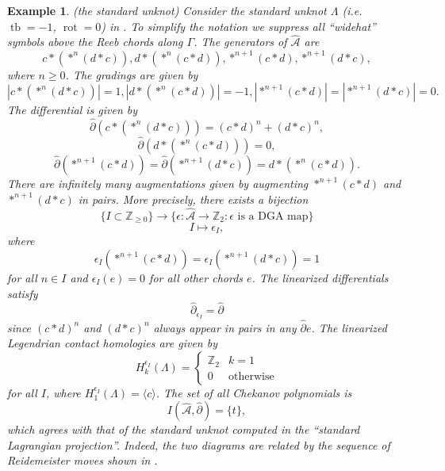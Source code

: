 \documentclass[11pt]{amsart}
\theoremstyle{mystyle}
\newtheorem{example}[example]{Example}
\newcommand{\Z}{\mathbb{Z}}
\newcommand{\<}{\langle}
\renewcommand{\>}{\rangle}
\DeclareMathOperator{\rot}{\text{rot}}
\DeclareMathOperator{\tb}{tb}
\begin{document}
\begin{example}(the standard unknot)
	Consider the standard unknot $\Lambda$ (i.e. $\tb = -1$, $\rot = 0$) in . To simplify the notation we suppress all ``widehat'' symbols above the Reeb chords along $\Gamma$. The generators of $\widehat{\mathcal{A}}$ are \[c *(*^n (d * c)), d *(*^n (c * d)), *^{n+1}(c*d), *^{n+1}(d*c),\] where $n \geq 0$. The gradings are given by \[|c *(*^n (d * c))| = 1, |d *(*^n (c * d))| = -1, |*^{n+1}(c*d)| = |*^{n+1}(d*c)| = 0.\] The differential is given by \[\widehat{\partial} (c *(*^n (d * c))) = (c*d)^n + (d*c)^n,\] \[\widehat{\partial} (d *(*^n (c * d))) = 0,\] \[\widehat{\partial}(*^{n+1}(c*d)) = \widehat{\partial}(*^{n+1}(d*c)) = d *(*^n (c * d)).\] There are infinitely many augmentations given by augmenting $*^{n+1}(c*d)$ and $*^{n+1}(d*c)$ in pairs. More precisely, there exists a bijection \[\{I \subset \mathbb{Z}_{\geq 0}\} \rightarrow \{\epsilon:\widehat{\mathcal{A}} \rightarrow \Z_2 : \epsilon \text{ is a DGA map}\}\] \[I \mapsto \epsilon_I,\] where \[\epsilon_I(*^{n+1}(c*d)) = \epsilon_I(*^{n+1}(d*c)) = 1\] for all $n \in I$ and $\epsilon_I(e) = 0$ for all other chords $e$. The linearized differentials satisfy \[\widehat{\partial}_{\epsilon_I} = \widehat{\partial}\] since $(c * d)^n$ and $(d * c)^n$ always appear in pairs in any $\widehat{\partial} e$. The linearized Legendrian contact homologies are given by \[H^{\epsilon_I}_k(\Lambda) = \begin{cases}
		\Z_2 & k = 1 \\
		0 & \text{otherwise}
	\end{cases}\] for all $I$, where $H^{\epsilon_I}_1(\Lambda) = \langle c \rangle$. The set of all Chekanov polynomials is \[I(\widehat{\mathcal{A}}, \widehat{\partial}) = \{t\},\] which agrees with that of the standard unknot computed in the ``standard Lagrangian projection''. Indeed, the two diagrams are related by the sequence of Reidemeister moves shown in .
\end{example}
\end{document}
